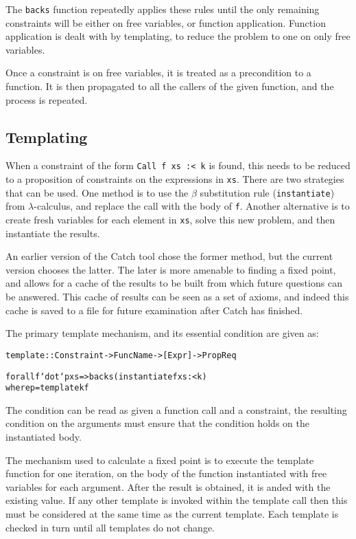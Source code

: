 \documentclass[preprint]{sigplanconf}
\newcommand{\T}[1]{\texttt{#1}}
\newenvironment{code}{\begin{alltt}\small}{\end{alltt}}
\begin{document}
The \T{backs} function repeatedly applies these rules until the only remaining constraints will be either on free variables, or function application. Function application is dealt with by templating, to reduce the problem to one on only free variables.

Once a constraint is on free variables, it is treated as a precondition to a function. It is then propagated to all the callers of the given function, and the process is repeated.

\subsection{Templating}
\label{sec:template}

When a constraint of the form \T{Call f xs :< k} is found, this needs to be reduced to a proposition of constraints on the expressions in \T{xs}. There are two strategies that can be used. One method is to use the $\beta$ substitution rule (\T{instantiate}) from $\lambda$-calculus, and replace the call with the body of \T{f}. Another alternative is to create fresh variables for each element in \T{xs}, solve this new problem, and then instantiate the results.

An earlier version of the Catch tool chose the former method, but the current version chooses the latter. The later is more amenable to finding a fixed point, and allows for a cache of the results to be built from which future questions can be answered. This cache of results can be seen as a set of axioms, and indeed this cache is saved to a file for future examination after Catch has finished.

The primary template mechanism, and its essential condition are given as:

\begin{code}
template :: Constraint -> FuncName -> [Expr] -> Prop Req

forall f `dot` p xs => backs (instantiate f xs :< k)
    where p = template k f
\end{code}

The condition can be read as given a function call and a constraint, the resulting condition on the arguments must ensure that the condition holds on the instantiated body.

The mechanism used to calculate a fixed point is to execute the template function for one iteration, on the body of the function instantiated with free variables for each argument. After the result is obtained, it is anded with the existing value. If any other template is invoked within the template call then this must be considered at the same time as the current template. Each template is checked in turn until all templates do not change.
\end{document}

